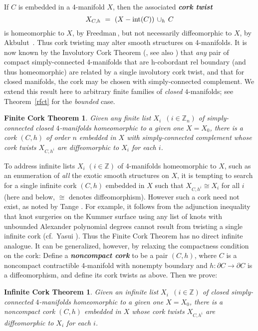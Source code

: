 \documentclass[11pt]{amsart}
\newtheorem*{fcthm*}{Finite Cork Theorem}
\newtheorem*{icthm*}{Infinite Cork Theorem}
\theoremstyle{definition}
\newcommand{\thmref}[1]{Theorem~\ref{#1}}
\newcommand{\bit}[1]{\textbf{\textit{#1}}} %
\newcommand{\bz}{\mathbb Z}
\newcommand{\del}{\partial}
\newcommand{\interior}{\textup{int}}
\begin{document}
If $C$ is embedded in a 4-manifold $X$, then the associated \bit{cork twist}
$$
X_{C,h} \ = \ (X-\interior(C))\,\cup_h \,C
$$
is homeomorphic to $X$, by Freedman\,\cite{freedman:simply-connected}, but not necessarily diffeomorphic to $X$, by Akbulut~\cite{akbulut:contractible}.  Thus cork twisting may alter smooth structures on 4-manifolds.  It is now known by the Involutory Cork Theorem (\cite{curtis-freedman-hsiang-stong,matveyev}, see also \cite{kirby:cork}) that {\sl any} pair of compact simply-connected 4-manifolds that are h-cobordant rel boundary (and thus homeomorphic) are related by a single involutory cork twist, and that for closed manifolds, the cork may be chosen with simply-connected complement.  We extend this result here to arbitrary finite families of {\sl closed} $4$-manifolds; see \thmref{rfct} for the {\sl bounded} case. 

\begin{fcthm*}\label{fcthm}
Given any finite list $X_i$ \,$(i\in\bz_n)$  of simply-connected closed $4$-manifolds homeomorphic to a given one $X = X_0$, there is a cork $(C,h)$ of order $n$ embedded in $X$ with simply-connected complement whose cork twists $X_{C,h^i}$ are diffeomorphic to $X_i$ for each $i$.
\end{fcthm*}

To address infinite lists $X_i$ $(i\in\bz)$ of 4-manifolds homeomorphic to $X$, such as an enumeration of {\sl all} the exotic smooth structures on $X$, it is tempting to search for a single infinite cork $(C,h)$ embedded in $X$ such that $X_{C,h^i} \cong X_i$ for all $i$ (here and below, $\cong$ denotes diffeomorphism).  However such a cork need not exist, as noted by Tange \cite{tange}. For example, it follows from the adjunction inequality that knot surgeries on the Kummer surface using any list of knots with unbounded Alexander polynomial degrees cannot result from twisting a single infinite cork (cf.\ Yasui \cite{yasui}).  Thus the Finite Cork Theorem has no direct infinite analogue.  It can be generalized, however, by relaxing the compactness condition on the cork:  Define a \bit{noncompact cork} to be a pair $(C,h)$, where $C$ is a noncompact contractible 4-manifold with nonempty boundary and $h\colon \del C\to\del C$ is a diffeomorphism, and define its cork twists as above.  Then we prove:

\begin{icthm*}\label{icthm}
Given an infinite list $X_i$ \,$(i\in\bz)$ of closed simply-connected $4$-manifolds homeomorphic to a given one $X=X_0$, there is a noncompact cork $(C,h)$ embedded in $X$ 
whose cork twists $X_{C,h^i}$ are diffeomorphic to $X_i$ for each $i$.
\end{icthm*}
\end{document}
